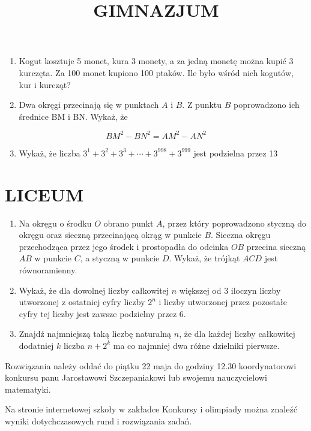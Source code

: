 \documentclass[10pt]{article}
\title{GIMNAZJUM }
\author{}
\date{}
\begin{document}
\maketitle
\begin{enumerate}
  \item Kogut kosztuje 5 monet, kura 3 monety, a za jedną monetę można kupić 3 kurczęta. Za 100 monet kupiono 100 ptaków. Ile było wśród nich kogutów, kur i kurcząt?
  \item Dwa okręgi przecinają się w punktach \(A\) i \(B\). Z punktu \(B\) poprowadzono ich średnice BM i BN. Wykaż, że
\end{enumerate}

\[
B M^{2}-B N^{2}=A M^{2}-A N^{2}
\]

\begin{enumerate}
  \setcounter{enumi}{2}
  \item Wykaż, że liczba \(3^{1}+3^{2}+3^{3}+\cdots+3^{998}+3^{999}\) jest podzielna przez 13
\end{enumerate}

\section*{LICEUM}
\begin{enumerate}
  \item Na okręgu o środku \(O\) obrano punkt \(A\), przez który poprowadzono styczną do okręgu oraz sieczną przecinającą okrąg w punkcie \(B\). Sieczna okręgu przechodząca przez jego środek i prostopadła do odcinka \(O B\) przecina sieczną \(A B\) w punkcie \(C\), a styczną w punkcie \(D\). Wykaż, że trójkąt \(A C D\) jest równoramienny.
  \item Wykaż, że dla dowolnej liczby całkowitej \(n\) większej od 3 iloczyn liczby utworzonej z ostatniej cyfry liczby \(2^{n}\) i liczby utworzonej przez pozostałe cyfry tej liczby jest zawsze podzielny przez 6.
  \item Znajdź najmniejszą taką liczbę naturalną \(n\), że dla każdej liczby całkowitej dodatniej \(k\) liczba \(n+2^{k}\) ma co najmniej dwa różne dzielniki pierwsze.
\end{enumerate}

Rozwiązania należy oddać do piątku 22 maja do godziny 12.30 koordynatorowi konkursu panu Jarostawowi Szczepaniakowi lub swojemu nauczycielowi matematyki.

Na stronie internetowej szkoły w zakładce Konkursy i olimpiady można znaleźć wyniki dotychczasowych rund i rozwiązania zadań.
\end{document}
